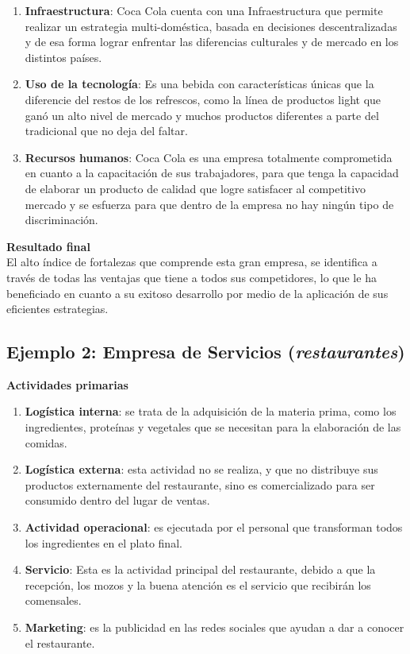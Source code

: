 \documentclass[12pt]{article}
\begin{document}
  \begin{enumerate}
    \item \textbf{Infraestructura}: Coca Cola cuenta con una Infraestructura que permite
    realizar un estrategia multi-doméstica, basada en decisiones descentralizadas y de esa
    forma lograr enfrentar las diferencias culturales y de mercado en los distintos países.

    \item \textbf{Uso de la tecnología}: Es una bebida con características únicas que la
    diferencie del restos de los refrescos, como la línea de productos light que ganó un 
    alto nivel de mercado y muchos productos diferentes a parte del tradicional que no 
    deja del faltar.

    \item \textbf{Recursos humanos}: Coca Cola es una empresa totalmente comprometida en 
    cuanto a la capacitación de sus trabajadores, para que tenga la capacidad de elaborar
    un producto de calidad que logre satisfacer al competitivo mercado y se esfuerza para 
    que dentro de la empresa no hay ningún tipo de discriminación. 
  \end{enumerate}

  \textbf{Resultado final}\\
  El alto índice de fortalezas que comprende esta gran empresa, se identifica a través de 
  todas las ventajas que tiene a todos sus competidores, lo que le ha beneficiado en cuanto
  a su exitoso desarrollo por medio de la aplicación de sus eficientes estrategias.

  \subsection{Ejemplo 2: Empresa de Servicios (\textit{restaurantes})}
  \textbf{Actividades primarias}\\

  \begin{enumerate}
    \item \textbf{Logística interna}: se trata de la adquisición de la materia prima, como
    los ingredientes, proteínas y vegetales que se necesitan para la elaboración de las 
    comidas.

    \item \textbf{Logística externa}: esta actividad no se realiza, y que no distribuye sus
    productos externamente del restaurante, sino es comercializado para ser consumido dentro
    del lugar de ventas.

    \item \textbf{Actividad operacional}: es ejecutada por el personal que transforman todos
    los ingredientes en el plato final.

    \item \textbf{Servicio}: Esta es la actividad principal del restaurante, debido a que la recepción, los mozos y la buena atención es el servicio que recibirán los comensales.

    \item \textbf{Marketing}: es la publicidad en las redes sociales que ayudan a dar a
    conocer el restaurante.
  \end{enumerate}
\end{document}
